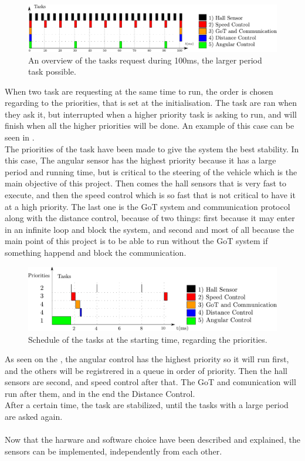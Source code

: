  \begin{figure}[H]
	\centering
	\includegraphics[scale=0.6]{figures/scheduleRequest.pdf}
	\caption{An overview of the tasks request during 100ms, the larger period task possible.}
	\label{scheduleRequestd}
\end{figure}


When two task are requesting at the same time to run, the order is chosen regarding to the priorities, that is set at the initialisation. The task are ran when they ask it, but interrupted when a higher priority task is asking to run, and will finish when all the higher priorities will be done. An example of this case can be seen in .\\
The priorities of the task have been made to give the system the best stability. In this case, The angular sensor has the highest priority because it has a large period and running time, but is critical to the steering of the vehicle which is the main objective of this project. Then comes the hall sensors that is very fast to execute, and then the speed control which is so fast that is not critical to have it at a high priority. The last one is the GoT system and communication protocol along with the distance control, because of two things: first because it may enter in an infinite loop and block the system, and second and most of all because the main point of this project is to be able to run without the GoT system if something happend and block the communication.

 \begin{figure}[H]
	\centering
	\includegraphics[scale=0.5]{figures/schedulePriorities.pdf}
	\caption{Schedule of the tasks at the starting time, regarding the priorities.}
	\label{schedulePriorities}
\end{figure}

As seen on the  , the angular control has the highest priority so it will run first, and the others will be registrered in a queue in order of priority. Then the hall sensors are second, and speed control after that. The GoT and comunication will run after them, and in the end the Distance Control.\\
After a certain time, the task are stabilized, until the tasks with a large period are asked again.\\\\



Now that the harware and software choice have been described and explained, the sensors can be implemented, independently from each other.